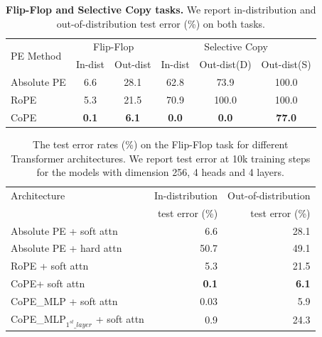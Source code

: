\documentclass{article}
\newcommand{\ours}{CoPE\xspace}
\begin{document}
\begin{table}[t]
  \caption{{\bf Flip-Flop and Selective Copy tasks.} We report in-distribution and out-of-distribution test error (\%) on both tasks.} %
  \label{tab:flipflop}
    \centering
    \begin{tabular}{lccccc}
    \toprule
    \multirow{2}{*}{PE Method} & \multicolumn{2}{c}{Flip-Flop} & \multicolumn{3}{c}{Selective Copy} \\
    \cmidrule(rl){2-3} \cmidrule(rl){4-6}
     &  In-dist & Out-dist  & In-dist & Out-dist(D) & Out-dist(S)    \\
    \midrule
    Absolute PE  & 6.6 & 28.1  & 62.8 & \phantom{0}73.9 & 100.0 \\
    RoPE & 5.3 & 21.5  &  70.9 & 100.0 & 100.0 \\
    \ours  & \bf 0.1 & \bf \phantom{0}6.1   & \bf \phantom{0}0.0 & \bf \phantom{00}0.0 & \bf \phantom{0}77.0 \\
    \bottomrule
  \end{tabular}
\end{table}
\fi
{}
\begin{table}[t]
  \caption{The test error rates (\%) on the Flip-Flop task for different Transformer architectures. We report test error at 10k training steps for the models with dimension 256, 4 heads and 4 layers.
  }
  \label{tab:flipflop}
  \centering
  \begin{tabular}{lrr}
    \toprule
        Architecture   & In-distribution& Out-of-distribution\\
          &   test error (\%) & test error (\%) \\
    \midrule
    Absolute PE + soft attn & 6.6 & 28.1 \\
    Absolute PE + hard attn & 50.7 & 49.1 \\
    RoPE + soft attn & 5.3 & 21.5 \\
    \ours + soft attn & \bf 0.1 & \bf 6.1 \\
    \midrule
    \ours\_MLP + soft attn & 0.03 & 5.9 \\
    \ours\_MLP$_{1^{st}\_layer}$ + soft attn & 0.9 & 24.3 \\
    \bottomrule
  \end{tabular}
\end{table}
\end{document}
